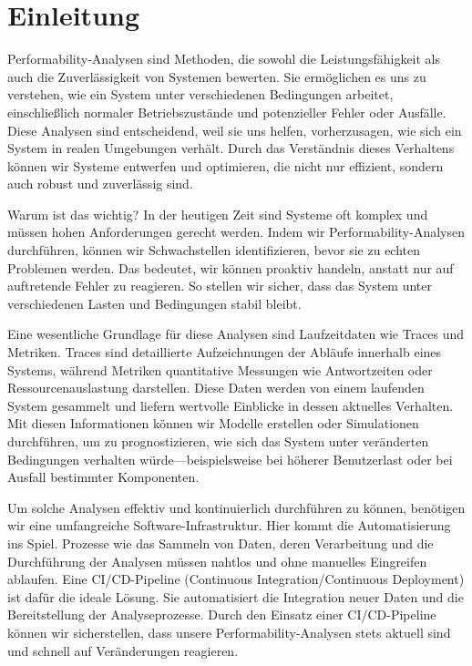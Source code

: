 
\section{Einleitung}
Performability-Analysen sind Methoden, die sowohl die Leistungsfähigkeit als auch die Zuverlässigkeit von Systemen bewerten. Sie ermöglichen es uns zu verstehen, wie ein System unter verschiedenen Bedingungen arbeitet, einschließlich normaler Betriebszustände und potenzieller Fehler oder Ausfälle. Diese Analysen sind entscheidend, weil sie uns helfen, vorherzusagen, wie sich ein System in realen Umgebungen verhält. Durch das Verständnis dieses Verhaltens können wir Systeme entwerfen und optimieren, die nicht nur effizient, sondern auch robust und zuverlässig sind.

Warum ist das wichtig? In der heutigen Zeit sind Systeme oft komplex und müssen hohen Anforderungen gerecht werden. Indem wir Performability-Analysen durchführen, können wir Schwachstellen identifizieren, bevor sie zu echten Problemen werden. Das bedeutet, wir können proaktiv handeln, anstatt nur auf auftretende Fehler zu reagieren. So stellen wir sicher, dass das System unter verschiedenen Lasten und Bedingungen stabil bleibt.

Eine wesentliche Grundlage für diese Analysen sind Laufzeitdaten wie Traces und Metriken. Traces sind detaillierte Aufzeichnungen der Abläufe innerhalb eines Systems, während Metriken quantitative Messungen wie Antwortzeiten oder Ressourcenauslastung darstellen. Diese Daten werden von einem laufenden System gesammelt und liefern wertvolle Einblicke in dessen aktuelles Verhalten. Mit diesen Informationen können wir Modelle erstellen oder Simulationen durchführen, um zu prognostizieren, wie sich das System unter veränderten Bedingungen verhalten würde—beispielsweise bei höherer Benutzerlast oder bei Ausfall bestimmter Komponenten.

Um solche Analysen effektiv und kontinuierlich durchführen zu können, benötigen wir eine umfangreiche Software-Infrastruktur. Hier kommt die Automatisierung ins Spiel. Prozesse wie das Sammeln von Daten, deren Verarbeitung und die Durchführung der Analysen müssen nahtlos und ohne manuelles Eingreifen ablaufen. Eine CI/CD-Pipeline (Continuous Integration/Continuous Deployment) ist dafür die ideale Lösung. Sie automatisiert die Integration neuer Daten und die Bereitstellung der Analyseprozesse. Durch den Einsatz einer CI/CD-Pipeline können wir sicherstellen, dass unsere Performability-Analysen stets aktuell sind und schnell auf Veränderungen reagieren.

